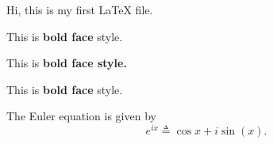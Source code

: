 \documentclass[12pt,a4paper]{article}
\begin{document}

Hi, this is my first \LaTeX{} file.

This is \textbf{bold face} style. \par
This is \bfseries bold face style. \par
This is {\bfseries bold face} style.














The Euler equation is given by
$$ e^{ix} \triangleq \cos{x} + i\sin(x). $$
\end{document}
